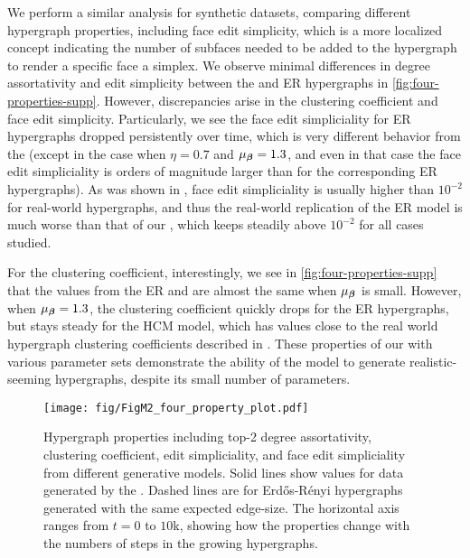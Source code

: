 We perform a similar analysis for synthetic datasets, comparing different hypergraph properties, including face edit simplicity, which is a more localized concept indicating the number of subfaces needed to be added to the hypergraph to render a specific face a simplex.  
We observe minimal differences in degree assortativity and edit simplicity between the \model and ER hypergraphs in \autoref{fig:four-properties-supp}. However, discrepancies arise in the clustering coefficient and face edit simplicity. Particularly, we see the face edit simpliciality for ER hypergraphs dropped persistently over time, which is very different behavior from the \model (except in the case when $\eta=0.7$ and $\mu_{\boldsymbol{\beta}}=1.3$, and even in that case the \model face edit simpliciality is orders of magnitude larger than for the corresponding ER hypergraphs). As was shown in \cite{landrySimplicialityHigherorderNetworks2024}, face edit simpliciality is usually higher than $10^{-2}$ for real-world hypergraphs, and thus the real-world replication of the ER model is much worse than that of our \model, which keeps steadily above $10^{-2}$ for all cases studied. 

For the clustering coefficient, interestingly, we see in \autoref{fig:four-properties-supp} that the values from the ER and \model are almost the same when $\mu_{\boldsymbol{\beta}}$ is small. However, when $\mu_{\boldsymbol{\beta}} = 1.3$, the clustering coefficient quickly drops for the ER hypergraphs, but stays steady for the HCM model, which has values close to the real world hypergraph clustering coefficients described in \cite{gallagherClusteringCoefficientsProtein2013}. These properties of our \model with various parameter sets demonstrate the ability of the model to generate realistic-seeming hypergraphs, despite its small number of parameters. 

\begin{figure*}[!ht]
    \centering
    \texttt{[image: fig/FigM2\_four\_property\_plot.pdf]} 
    \caption{Hypergraph properties including top-2 degree assortativity, clustering coefficient, edit simpliciality, and face edit simpliciality from different generative models. Solid lines show values for data generated by the \model. Dashed lines are for Erd\H{o}s-R\'enyi hypergraphs generated with the same expected edge-size. The horizontal axis ranges from $t=0$ to $10$k, showing how the properties change with the numbers of steps in the growing hypergraphs.}
    \label{fig:four-properties-supp}
\end{figure*}

